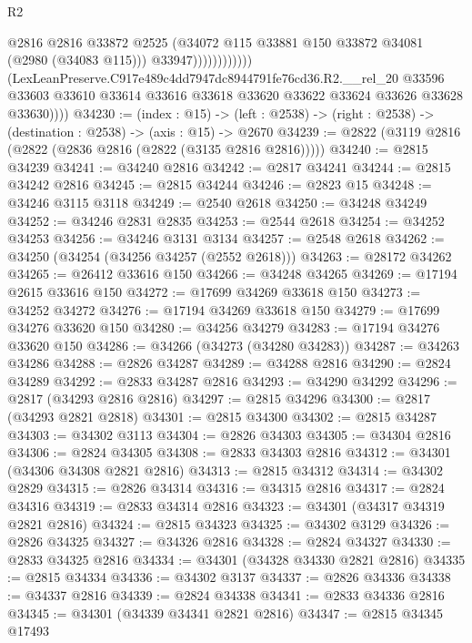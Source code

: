 \begin{lexlean}{R2}
\begin{coremodule}
                                  @2816
                                  @2816
                                  @33872
                                  @2525
                                  (@34072 @115 @33881 @150 @33872 @34081 (@2980 (@34083 @115)))
                                  @33947))))))))))))
          (LexLeanPreserve.C917e489c4dd7947dc8944791fe76cd36.R2.__rel_20
            @33596
            @33603
            @33610
            @33614
            @33616
            @33618
            @33620
            @33622
            @33624
            @33626
            @33628
            @33630))))
@34230 := (index : @15) ->
  (left : @2538) -> (right : @2538) -> (destination : @2538) -> (axis : @15) -> @2670
@34239 := @2822 (@3119 @2816 (@2822 (@2836 @2816 (@2822 (@3135 @2816 @2816)))))
@34240 := @2815 @34239
@34241 := @34240 @2816
@34242 := @2817 @34241
@34244 := @2815 @34242 @2816
@34245 := @2815 @34244
@34246 := @2823 @15
@34248 := @34246 @3115 @3118
@34249 := @2540 @2618
@34250 := @34248 @34249
@34252 := @34246 @2831 @2835
@34253 := @2544 @2618
@34254 := @34252 @34253
@34256 := @34246 @3131 @3134
@34257 := @2548 @2618
@34262 := @34250 (@34254 (@34256 @34257 (@2552 @2618)))
@34263 := @28172 @34262
@34265 := @26412 @33616 @150
@34266 := @34248 @34265
@34269 := @17194 @2615 @33616 @150
@34272 := @17699 @34269 @33618 @150
@34273 := @34252 @34272
@34276 := @17194 @34269 @33618 @150
@34279 := @17699 @34276 @33620 @150
@34280 := @34256 @34279
@34283 := @17194 @34276 @33620 @150
@34286 := @34266 (@34273 (@34280 @34283))
@34287 := @34263 @34286
@34288 := @2826 @34287
@34289 := @34288 @2816
@34290 := @2824 @34289
@34292 := @2833 @34287 @2816
@34293 := @34290 @34292
@34296 := @2817 (@34293 @2816 @2816)
@34297 := @2815 @34296
@34300 := @2817 (@34293 @2821 @2818)
@34301 := @2815 @34300
@34302 := @2815 @34287
@34303 := @34302 @3113
@34304 := @2826 @34303
@34305 := @34304 @2816
@34306 := @2824 @34305
@34308 := @2833 @34303 @2816
@34312 := @34301 (@34306 @34308 @2821 @2816)
@34313 := @2815 @34312
@34314 := @34302 @2829
@34315 := @2826 @34314
@34316 := @34315 @2816
@34317 := @2824 @34316
@34319 := @2833 @34314 @2816
@34323 := @34301 (@34317 @34319 @2821 @2816)
@34324 := @2815 @34323
@34325 := @34302 @3129
@34326 := @2826 @34325
@34327 := @34326 @2816
@34328 := @2824 @34327
@34330 := @2833 @34325 @2816
@34334 := @34301 (@34328 @34330 @2821 @2816)
@34335 := @2815 @34334
@34336 := @34302 @3137
@34337 := @2826 @34336
@34338 := @34337 @2816
@34339 := @2824 @34338
@34341 := @2833 @34336 @2816
@34345 := @34301 (@34339 @34341 @2821 @2816)
@34347 := @2815 @34345 @17493

\end{coremodule}
\end{lexlean}
